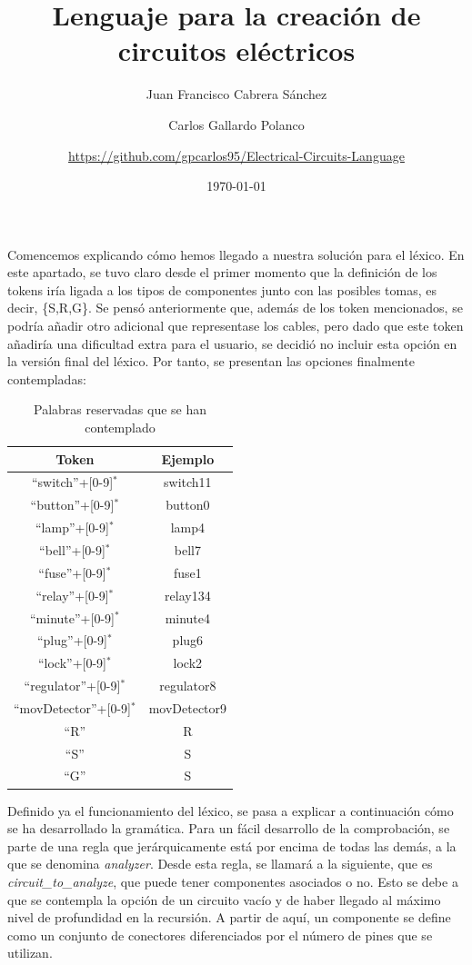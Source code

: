 \documentclass{article}
\author{Juan Francisco Cabrera Sánchez \and Carlos Gallardo Polanco \and \newline \url{https://github.com/gpcarlos95/Electrical-Circuits-Language}}
\title{Lenguaje para la creación de circuitos eléctricos}
\date{\today}
\begin{document}
\maketitle

Comencemos explicando cómo hemos llegado a nuestra solución para el léxico. En este apartado, se tuvo claro desde el primer momento que la definición de los tokens iría ligada a los tipos de componentes junto con las posibles tomas, es decir, \{S,R,G\}. Se pensó anteriormente que, además de los token mencionados, se podría añadir otro adicional que representase los cables, pero dado que este token añadiría una dificultad extra para el usuario, se decidió no incluir esta opción en la versión final del léxico. Por tanto, se presentan las opciones finalmente contempladas:

\begin{table}[h!]
  \centering
  \begin{tabular}{|c|c|}
    \hline
    Token & Ejemplo \\ \hline
  ``switch''+[0-9]$^*$ & switch11 \\ \hline
  ``button''+[0-9]$^*$ & button0 \\ \hline
  ``lamp''+[0-9]$^*$ & lamp4 \\ \hline
  ``bell''+[0-9]$^*$ & bell7 \\ \hline
  ``fuse''+[0-9]$^*$ & fuse1 \\ \hline
  ``relay''+[0-9]$^*$ & relay134 \\ \hline
  ``minute''+[0-9]$^*$ & minute4 \\ \hline
  ``plug''+[0-9]$^*$ & plug6 \\ \hline
  ``lock''+[0-9]$^*$ & lock2 \\ \hline
  ``regulator''+[0-9]$^*$ & regulator8 \\ \hline
  ``movDetector''+[0-9]$^*$ & movDetector9 \\ \hline
  ``R'' & R \\ \hline
  ``S'' & S \\ \hline
  ``G'' & S \\ \hline
  \end{tabular}
  \caption{Palabras reservadas que se han contemplado}
  \label{}
\end{table}

Definido ya el funcionamiento del léxico, se pasa a explicar a continuación cómo se ha desarrollado la gramática. Para un fácil desarrollo de la comprobación, se parte de una regla que jerárquicamente está por encima de todas las demás, a la que se denomina \emph{analyzer}. Desde esta regla, se llamará a la siguiente, que es \emph{circuit\_to\_analyze}, que puede tener componentes asociados o no. Esto se debe a que se contempla la opción de un circuito vacío y de haber llegado al máximo nivel de profundidad en la recursión. A partir de aquí, un componente se define como un conjunto de conectores diferenciados por el número de pines que se utilizan.
\end{document}
